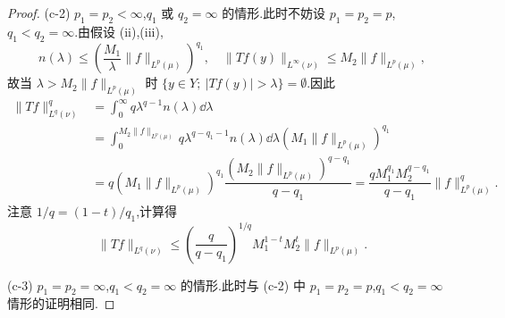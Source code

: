 \begin{proof}
(c-2) $p_{1} = p_{2} < \infty$,$q_{1}$ 或 $q_{2} = \infty$ 的情形.此时不妨设 $p_{1} = p_{2} = p$,$q_{1} < q_{2} = \infty$.由假设 (ii),(iii),
\begin{equation*}
n(\lambda) \leq \left(\frac{M_{1}}{\lambda}\| f \|_{L^{p}(\mu)}\right)^{q_{1}}, \quad \| Tf(y) \|_{L^{\infty}(\nu)} \leq M_{2}\| f \|_{L^{p}(\mu)},
\end{equation*}
故当 $\lambda > M_{2}\| f \|_{L^{p}(\mu)}$ 时 $\{y \in Y;\ |Tf(y)| > \lambda\} = \emptyset$.因此
\begin{align*}
\| Tf \|_{L^{q}(\nu)}^{q} &= \displaystyle\int_{0}^{\infty}q\lambda^{q-1}n(\lambda)\dd \lambda \\
&= \displaystyle\int_{0}^{M_{2}\| f \|_{L^{p}(\mu)}}q\lambda^{q-q_{1}-1}n(\lambda)\dd \lambda\left(M_{1}\| f \|_{L^{p}(\mu)}\right)^{q_{1}} \\
&= q\left(M_{1}\| f \|_{L^{p}(\mu)}\right)^{q_{1}}\dfrac{\left(M_{2}\| f \|_{L^{p}(\mu)}\right)^{q-q_{1}}}{q - q_{1}} = \dfrac{qM_{1}^{q_{1}}M_{2}^{q-q_{1}}}{q - q_{1}}\| f \|_{L^{p}(\mu)}^{q}.
\end{align*}
注意 $1/q = (1-t)/q_{1}$,计算得
\begin{equation*}
\| Tf \|_{L^{q}(\nu)} \leq \left(\frac{q}{q - q_{1}}\right)^{1/q}M_{1}^{1-t}M_{2}^{t}\| f \|_{L^{p}(\mu)}.
\end{equation*}

(c-3) $p_{1} = p_{2} = \infty$,$q_{1} < q_{2} = \infty$ 的情形.此时与 (c-2) 中 $p_{1} = p_{2} = p$,$q_{1} < q_{2} = \infty$ 情形的证明相同.
\end{proof}
